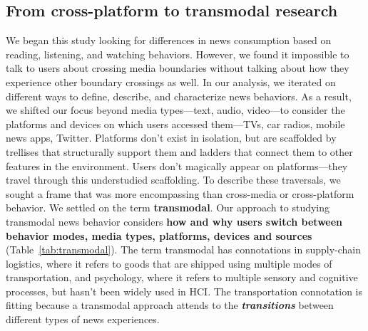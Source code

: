 \documentclass[sigchi]{acmart}
\begin{document}
\subsection{From cross-platform to transmodal research}
We began this study looking for differences in news consumption based on reading, listening, and watching behaviors. However, we found it impossible to talk to users about crossing media boundaries without talking about how they experience other boundary crossings as well. In our analysis, we iterated on different ways to define, describe, and characterize news behaviors. As a result, we shifted our focus beyond media types—text, audio, video—to consider the platforms and devices on which users accessed them—TVs, car radios, mobile news apps, Twitter. Platforms don’t exist in isolation, but are scaffolded by trellises that structurally support them and ladders that connect them to other features in the environment. Users don’t magically appear on platforms—they travel through this understudied scaffolding. To describe these traversals, we sought a frame that was more encompassing than cross-media or cross-platform behavior. We settled on the term \textbf{transmodal}\textit{}. Our approach to studying transmodal news behavior considers \textbf{how and why users switch between behavior modes, media types, platforms, devices and sources} (Table~\ref{tab:transmodal}). The term transmodal has connotations in supply-chain logistics, where it refers to goods that are shipped using multiple modes of transportation, and psychology, where it refers to multiple sensory and cognitive processes, but hasn't been widely used in HCI. The transportation connotation is fitting because a transmodal approach attends to the \textbf{\textit{transitions}} between different types of news experiences.
\end{document}
